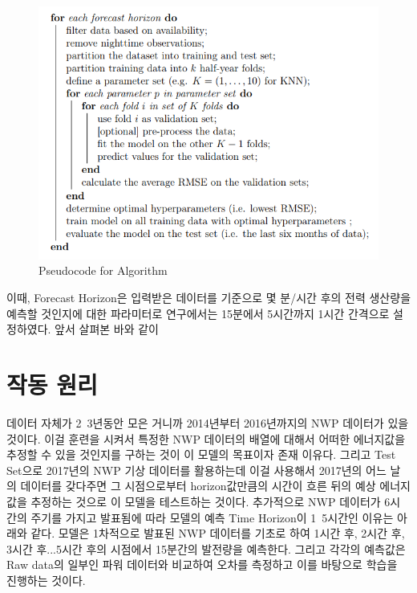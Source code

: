 \documentclass{article}
\begin{document}
\begin{figure}[h]
\centering
\includegraphics[scale=0.70]{./fig/Figure_5.png}
\caption{Pseudocode for Algorithm}
\label{fig_4}
\end{figure}

이때, Forecast Horizon은 입력받은 데이터를 기준으로 몇 분/시간 후의 전력 생산량을 예측할 것인지에 대한 파라미터로 연구에서는 15분에서 5시간까지 1시간 간격으로 설정하였다. 앞서 살펴본 바와 같이

\section{작동 원리}
데이터 자체가 2~3년동안 모은 거니까 2014년부터 2016년까지의 NWP 데이터가 있을 것이다. 이걸 훈련을 시켜서 특정한 NWP 데이터의 배열에 대해서 어떠한 에너지값을 추정할 수 있을 것인지를 구하는 것이 이 모델의 목표이자 존재 이유다.
그리고 Test Set으로 2017년의 NWP 기상 데이터를 활용하는데 이걸 사용해서 2017년의 어느 날의 데이터를 갖다주면 그 시점으로부터 horizon값만큼의 시간이 흐른 뒤의 예상 에너지값을 추정하는 것으로 이 모델을 테스트하는 것이다. 추가적으로 NWP 데이터가 6시간의 주기를 가지고 발표됨에 따라 모델의 예측 Time Horizon이 1~5시간인 이유는 아래와 같다. 모델은 1차적으로 발표된 NWP 데이터를 기초로 하여 1시간 후, 2시간 후, 3시간 후...5시간 후의 시점에서 15분간의 발전량을 예측한다. 그리고 각각의 예측값은 Raw data의 일부인 파워 데이터와 비교하여 오차를 측정하고 이를 바탕으로 학습을 진행하는 것이다.
\end{document}
